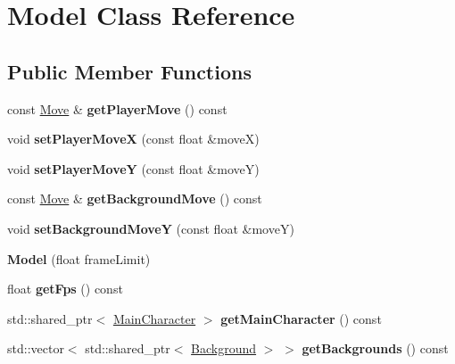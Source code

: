 \hypertarget{class_model}{}\section{Model Class Reference}
\label{class_model}
\subsection*{Public Member Functions}
\begin{DoxyCompactItemize}
\item 
\mbox{\label{class_model_a8352e72694201310bb9547964f33805e}} 
const \hyperlink{struct_move}{Move} \& {\bfseries get\+Player\+Move} () const
\item 
\mbox{\label{class_model_a0244b243926e1a87c665f3ad5e93f969}} 
void {\bfseries set\+Player\+MoveX} (const float \&moveX)
\item 
\mbox{\label{class_model_aaf51aa15e5207002ab11bab7bc5ddf53}} 
void {\bfseries set\+Player\+MoveY} (const float \&moveY)
\item 
\mbox{\label{class_model_ae1dba27e8f978f6a0a88f19eaa7d4c35}} 
const \hyperlink{struct_move}{Move} \& {\bfseries get\+Background\+Move} () const
\item 
\mbox{\label{class_model_ac28ab3c0e3b6d7c18b6a73e7b9751d37}} 
void {\bfseries set\+Background\+MoveY} (const float \&moveY)
\item 
\mbox{\label{class_model_acbf5b4b8802d6b98edd508abfc447d01}} 
{\bfseries Model} (float frame\+Limit)
\item 
\mbox{\label{class_model_aa4c3ab6b5c637225bd1136ca0b703344}} 
float {\bfseries get\+Fps} () const
\item 
\mbox{\label{class_model_a4c501d09ee4fa6bcb9b93a20781e2e70}} 
std\+::shared\+\_\+ptr$<$ \hyperlink{class_main_character}{Main\+Character} $>$ {\bfseries get\+Main\+Character} () const
\item 
\mbox{\label{class_model_aecbb3a282ee591c997375c8bc77ce174}} 
std\+::vector$<$ std\+::shared\+\_\+ptr$<$ \hyperlink{class_background}{Background} $>$ $>$ {\bfseries get\+Backgrounds} () const

\end{DoxyCompactItemize}

